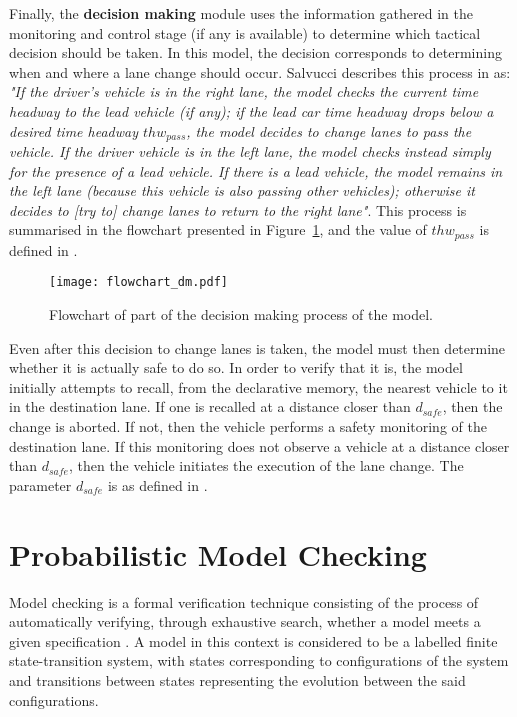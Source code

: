 Finally, the \textbf{decision making} module uses the information gathered in the monitoring and control stage (if any is available) to determine which tactical decision should be taken. In this model, the decision corresponds to determining when and where a lane change should occur. Salvucci describes this process in \cite{salvucci_1} as: \textit{"If the driver’s vehicle is in the right lane, the model checks the current time headway to the lead vehicle (if any); if the lead car time headway drops below a desired time headway $thw_{pass}$, the model decides to change lanes to pass the vehicle. If the driver vehicle is in the left lane, the model checks instead simply for the presence of a lead vehicle. If there is a lead vehicle, the model remains in the left lane (because this vehicle is also passing other vehicles); otherwise it decides to [try to] change lanes to return to the right lane"}. This process is summarised in the flowchart presented in Figure~\ref{fig:flowchart_dm}, and the value of $thw_{pass}$ is defined in \cite{salvucci_1}.

\begin{figure}[h]
    \centering
    \texttt{[image: flowchart\_dm.pdf]}
    \caption{Flowchart of part of the decision making process of the model.}
    \label{fig:flowchart_dm}
\end{figure}

Even after this decision to change lanes is taken, the model must then determine whether it is actually safe to do so. In order to verify that it is, the model initially attempts to recall, from the declarative memory, the nearest vehicle to it in the destination lane. If one is recalled at a distance closer than $d_{safe}$, then the change is aborted. If not, then the vehicle performs a safety monitoring of the destination lane. If this monitoring does not observe a vehicle at a distance closer than $d_{safe}$, then the vehicle initiates the execution of the lane change. The parameter $d_{safe}$ is as defined in \cite{salvucci_1}.

\section{Probabilistic Model Checking}

Model checking is a formal verification technique consisting of the process of automatically verifying, through exhaustive search, whether a model meets a given specification \cite{bk08}. A model in this context is considered to be a labelled finite state-transition system, with states corresponding to configurations of the system and transitions between states representing the evolution between the said configurations.


